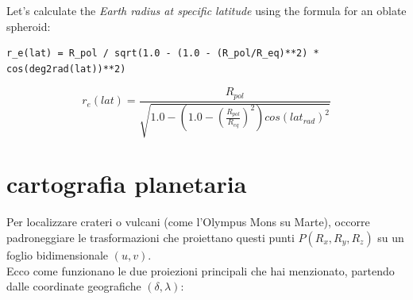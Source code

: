 \documentclass[a4paper,14pt]{article}
\begin{document}
Let's calculate the \emph{Earth radius at specific latitude} using the formula for an oblate spheroid:
\begin{verbatim}
r_e(lat) = R_pol / sqrt(1.0 - (1.0 - (R_pol/R_eq)**2) * cos(deg2rad(lat))**2)                                                                             \end{verbatim}
\[ r_e(lat) = \frac{R_{pol}}{\sqrt{1.0 - (1.0 - (\frac{R_{pol}}{R_{eq}})^{2}) cos(lat_{rad})^{2}}} \]
\section{cartografia planetaria}
Per localizzare crateri o vulcani (come l'Olympus Mons su Marte), occorre padroneggiare le trasformazioni che proiettano questi punti \(P(R_{x},R_{y},R_{z})\) su un foglio bidimensionale \((u,v)\).\\
Ecco come funzionano le due proiezioni principali che hai menzionato, partendo dalle coordinate geografiche \((\delta ,\lambda )\):\\
\end{document}
